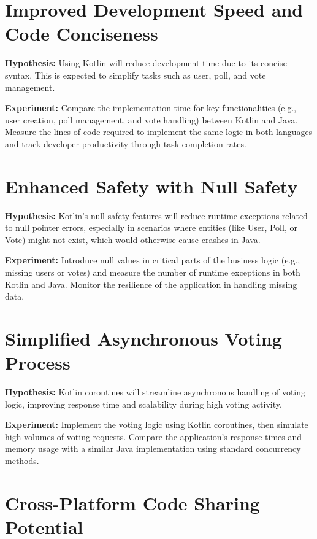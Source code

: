 \section*{Improved Development Speed and Code Conciseness}

\textbf{Hypothesis:} Using Kotlin will reduce development time due to its concise syntax. This is expected to simplify tasks such as user, poll, and vote management.

\textbf{Experiment:} Compare the implementation time for key functionalities (e.g., user creation, poll management, and vote handling) between Kotlin and Java. Measure the lines of code required to implement the same logic in both languages and track developer productivity through task completion rates.

\section*{Enhanced Safety with Null Safety}

\textbf{Hypothesis:} Kotlin’s null safety features will reduce runtime exceptions related to null pointer errors, especially in scenarios where entities (like User, Poll, or Vote) might not exist, which would otherwise cause crashes in Java.

\textbf{Experiment:} Introduce null values in critical parts of the business logic (e.g., missing users or votes) and measure the number of runtime exceptions in both Kotlin and Java. Monitor the resilience of the application in handling missing data.

\section*{Simplified Asynchronous Voting Process}

\textbf{Hypothesis:} Kotlin coroutines will streamline asynchronous handling of voting logic, improving response time and scalability during high voting activity.

\textbf{Experiment:} Implement the voting logic using Kotlin coroutines, then simulate high volumes of voting requests. Compare the application’s response times and memory usage with a similar Java implementation using standard concurrency methods.

\section*{Cross-Platform Code Sharing Potential}


